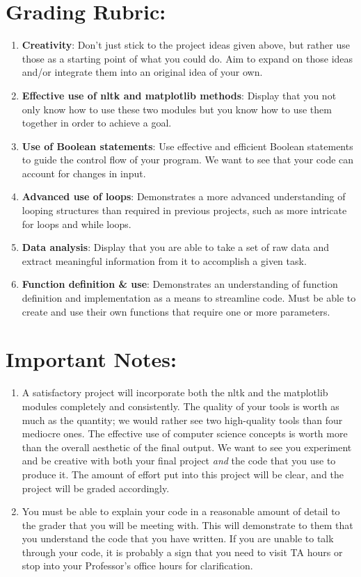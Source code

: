 \documentclass[11pt, letterpaper, onecolumn, oneside, final]{article}
\begin{document}
    \section{Grading Rubric:} 
    \begin{enumerate}
        \item \textbf{Creativity}: Don't just stick to the project ideas given above, but rather use those as a starting point of what you could do. Aim to expand on those ideas and/or integrate them into an original idea of your own.
        \item \textbf{Effective use of {\consolas nltk} and {\consolas matplotlib} methods}: Display that you not only know how to use these two modules but you know how to use them together in order to achieve a goal. 
        \item \textbf{Use of Boolean statements}: Use effective and efficient Boolean statements to guide the control flow of your program. We want to see that your code can account for changes in input.
        \item \textbf{Advanced use of loops}: Demonstrates a more advanced understanding of looping structures than required in previous projects, such as more intricate for loops and while loops.
        \item \textbf{Data analysis}: Display that you are able to take a set of raw data and extract meaningful information from it to accomplish a given task.
        \item \textbf{Function definition \& use}: Demonstrates an understanding of function definition and implementation as a means to streamline code. Must be able to create and use their own functions that require one or more parameters.
    \end{enumerate}
    \section{Important Notes:} 
    \begin{enumerate}
        \item A satisfactory project will incorporate both the {\consolas nltk} and the {\consolas matplotlib} modules completely and consistently. The quality of your tools is worth as much as the quantity; we would rather see two high-quality tools than four mediocre ones. The effective use of computer science concepts is worth more than the overall aesthetic of the final output. We want to see you experiment and be creative with both your final project \emph{and} the code that you use to produce it. The amount of effort put into this project will be clear, and the project will be graded accordingly.
        \item You must be able to explain your code in a reasonable amount of detail to the grader that you will be meeting with. This will demonstrate to them that you understand the code that you have written. If you are unable to talk through your code, it is probably a sign that you need to visit TA hours or stop into your Professor's office hours for clarification. 
    \end{enumerate}

    
\end{document}
